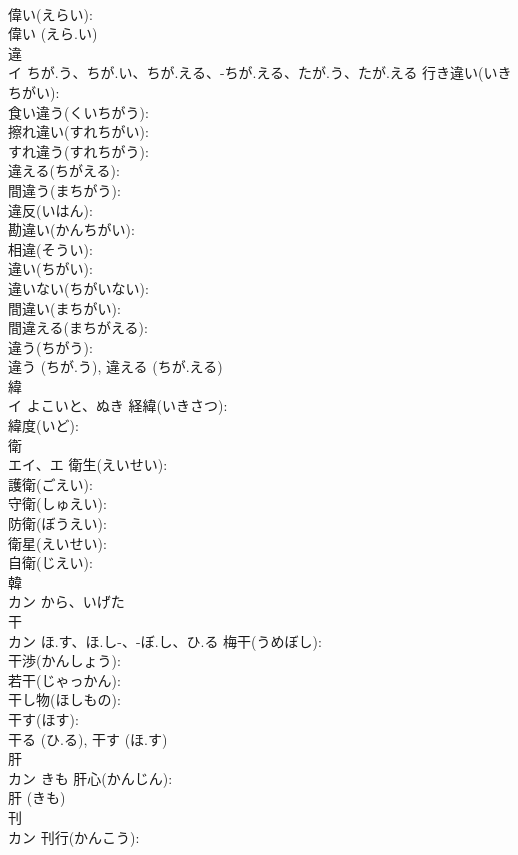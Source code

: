 \documentclass[8pt]{extreport}
\begin{document}
\begin{CJK}{UTF8}{min}
\\	偉い(えらい): 
\\	偉い (えら.い)
\\	違			
\\	イ	ちが.う、ちが.い、ちが.える、-ちが.える、たが.う、たが.える	行き違い(いきちがい): 
\\	食い違う(くいちがう): 
\\	擦れ違い(すれちがい): 
\\	すれ違う(すれちがう): 
\\	違える(ちがえる): 
\\	間違う(まちがう): 
\\	違反(いはん): 
\\	勘違い(かんちがい): 
\\	相違(そうい): 
\\	違い(ちがい): 
\\	違いない(ちがいない): 
\\	間違い(まちがい): 
\\	間違える(まちがえる): 
\\	違う(ちがう): 
\\	違う (ちが.う), 違える (ちが.える)
\\	緯			
\\	イ	よこいと、ぬき	経緯(いきさつ): 
\\	緯度(いど): 
\\	衛			
\\	エイ、エ		衛生(えいせい): 
\\	護衛(ごえい): 
\\	守衛(しゅえい): 
\\	防衛(ぼうえい): 
\\	衛星(えいせい): 
\\	自衛(じえい): 
\\	韓			
\\	カン	から、いげた		
\\	干			
\\	カン	ほ.す、ほ.し-、-ぼ.し、ひ.る	梅干(うめぼし): 
\\	干渉(かんしょう): 
\\	若干(じゃっかん): 
\\	干し物(ほしもの): 
\\	干す(ほす): 
\\	干る (ひ.る), 干す (ほ.す)
\\	肝			
\\	カン	きも	肝心(かんじん): 
\\	肝 (きも)
\\	刊			
\\	カン		刊行(かんこう): 

\end{CJK}
\end{document}
